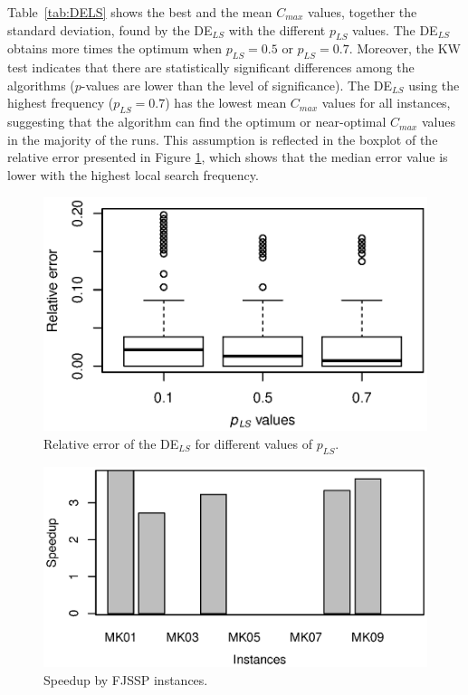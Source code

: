 Table~\ref{tab:DELS} shows the best and the mean $C_{max}$ values, together the standard deviation, found by the DE$_{LS}$ with the different $p_{LS}$ values. The DE$_{LS}$ obtains more times the optimum when $p_{LS}=0.5$ or $p_{LS}=0.7 $.  Moreover, the KW test indicates that there are statistically significant differences among the algorithms ($p$-values are lower than the level of significance). The DE$_{LS}$ using the highest frequency ($p_{LS}=0.7$) has the lowest mean $C_{max}$ values for all instances, suggesting that the algorithm can find the optimum or near-optimal $C_{max}$ values in the majority of the runs. This assumption is reflected in the boxplot of the relative error presented in Figure \ref{fig:DELSboxplot}, which shows that the median error value is lower with the highest local search frequency.
%
\begin{figure}[!tb]
    \centering
    \includegraphics[width=\linewidth]{./figures/Boxplot-DELS.eps}
    \caption{Relative error of the DE$_{LS}$  for different values of $p_{LS}$.}
    \label{fig:DELSboxplot}
\end{figure}
%
\begin{figure}[!tb]
\scriptsize
\centering
   \includegraphics[width=\linewidth]{figures/speedup.eps}
   \vspace{-0.9cm}
    \caption{Speedup by FJSSP instances.}
    \label{fig:speedup}
\end{figure}

